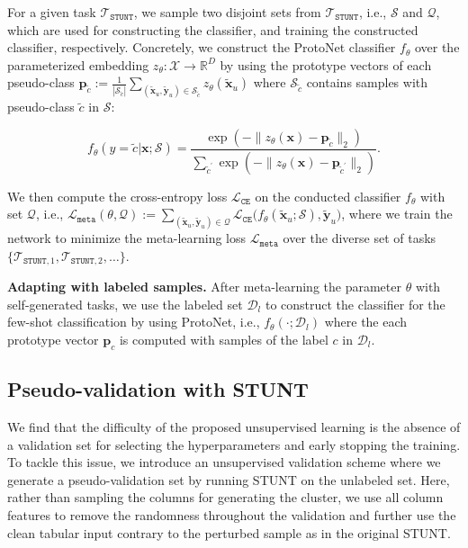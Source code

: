 For a given task $\mathcal{T}_{\mathtt{STUNT}}$, we sample two disjoint sets from $\mathcal{T}_{\mathtt{STUNT}}$, i.e., $\mathcal{S}$ and $\mathcal{Q}$, which are used for constructing the classifier, and training the constructed classifier, respectively. Concretely, we construct the ProtoNet classifier $f_\theta$
over the parameterized embedding $z_\theta: \mathcal{X}\to\mathbb{R}^D$ by using the prototype vectors of each pseudo-class ${\mathbf{p}}_{\tilde{c}}:=\frac{1}{|\mathcal{S}_{\tilde{c}}|}\sum_{(\tilde{{\mathbf{x}}}_u,\tilde{{\mathbf{y}}}_u)\in\mathcal{S}_{\tilde{c}}}z_{\theta}(\tilde{{\mathbf{x}}}_u)$ where $\mathcal{S}_{\tilde{c}}$ contains samples with pseudo-class $\tilde{c}$ in $\mathcal{S}$:

\begin{equation}
    f_{\theta}(y=\tilde{c}|{\mathbf{x}};\mathcal{S}) = \frac{\exp(-\lVert z_{\theta}({\mathbf{x}})-{{\mathbf{p}}}_{\tilde{c}}\rVert_{2})}
    {\sum_{\tilde{c}^{'}} \exp(-\lVert z_{\theta}({\mathbf{x}}) - {{\mathbf{p}}}_{\tilde{c}^{'}} \rVert_{2})}.
    \label{eq:protonet}
\end{equation}

We then compute the cross-entropy loss $\mathcal{L}_{\mathtt{CE}}$ on the conducted classifier $f_\theta$
with set $\mathcal{Q}$, i.e., 
$\mathcal{L}_{\mathtt{meta}}(\theta,\mathcal{Q}):=\sum_{(\tilde{{\mathbf{x}}}_u,\tilde{{\mathbf{y}}}_u)\in\mathcal{Q}} \mathcal{L}_{\mathtt{CE}}\big(f_{\theta}(\tilde{{\mathbf{x}}}_u;\mathcal{S}), \tilde{{\mathbf{y}}}_u\big)$, where we train the network to minimize the meta-learning loss $\mathcal{L}_{\mathtt{meta}}$ over the diverse set of tasks $\{\mathcal{T}_{\mathtt{STUNT},1},\mathcal{T}_{\mathtt{STUNT},2},\dots\}$.

\textbf{Adapting with labeled samples.} After meta-learning the parameter $\theta$ with self-generated tasks, we use the labeled set $\mathcal{D}_l$ to construct the classifier for the few-shot classification by using ProtoNet, i.e., $f_{\theta}(\cdot;\mathcal{D}_l)$ where the each prototype vector ${\mathbf{p}}_c$ is computed with samples of the label $c$ in $\mathcal{D}_l$.

\subsection{Pseudo-validation with STUNT}
\label{sec:pseudo_val}

We find that the difficulty of the proposed unsupervised learning is the absence of a validation set for selecting the hyperparameters and early stopping the training. To tackle this issue, we introduce an unsupervised validation scheme where we generate a pseudo-validation set by running STUNT on the unlabeled set. Here, rather than sampling the columns for generating the cluster, we use all column features to remove the randomness throughout the validation and further use the clean tabular input contrary to the perturbed sample as in the original STUNT.

